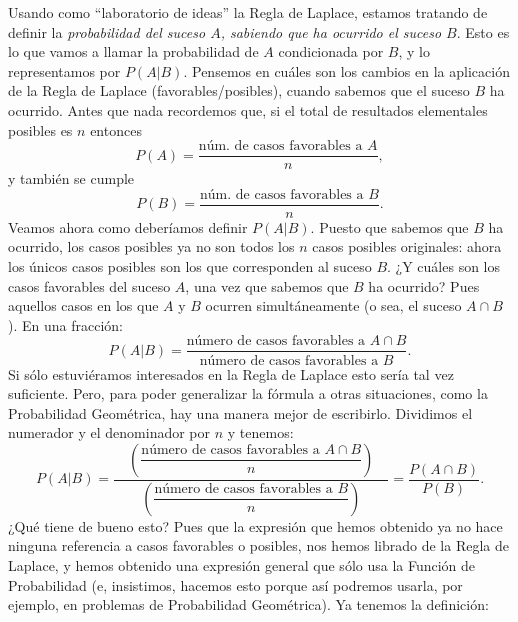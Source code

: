 Usando como ``laboratorio de ideas'' la Regla de Laplace, estamos tratando de
definir la {\em probabilidad del suceso $A$, {\sf sabiendo} que ha ocurrido
el suceso $B$}. Esto es lo que vamos a llamar la  {\sf probabilidad de $A$ condicionada por $B$, y lo
representamos por $P(A|B)$}. Pensemos en cuáles son los cambios en la
aplicación de la Regla de Laplace (favorables/posibles), cuando sabemos que
el suceso $B$ ha ocurrido. Antes que nada recordemos que, si el total de
resultados elementales posibles es $n$ entonces
    \[P(A)=\dfrac{\mbox{núm. de casos favorables a $A$}}{n},\]
y también se cumple
    \[P(B)=\dfrac{\mbox{núm. de casos favorables a $B$}}{n}.\]
Veamos ahora como deberíamos definir $P(A|B)$. Puesto que sabemos que $B$ ha
ocurrido, los casos posibles ya no son todos los $n$ casos posibles
originales: ahora los únicos casos posibles son los que corresponden al
suceso $B$.  ¿Y cuáles son los casos favorables del suceso $A$, una vez que
sabemos que $B$ ha ocurrido? Pues aquellos casos en los que $A$ y $B$ ocurren
simultáneamente (o sea, el suceso $A\cap B$). En una fracción:
    \[P(A|B)=\dfrac{\mbox{número de casos favorables a $A\cap B$}}{\mbox{número de casos favorables a $B$}}.\]
Si sólo estuviéramos interesados en la Regla de Laplace esto sería tal vez
suficiente. Pero, para poder generalizar la fórmula a otras situaciones, como
la Probabilidad Geométrica, hay una manera mejor de escribirlo. Dividimos el
numerador y el denominador por $n$ y tenemos:
    \[P(A|B)=\dfrac{\quad\left(\dfrac{\mbox{número de casos favorables a $A\cap B$}}{n}\right)\quad}{\left(\dfrac{\mbox{número de casos favorables a $B$}}{n}\right)}=\dfrac{P(A\cap B)}{P(B)}.\]
¿Qué tiene de bueno esto? Pues que la expresión que hemos obtenido ya no hace
ninguna referencia a casos favorables o posibles, nos hemos librado de la
Regla de Laplace, y hemos obtenido una expresión general que sólo usa la
Función de Probabilidad (e, insistimos, hacemos esto porque así podremos
usarla, por ejemplo, en problemas de Probabilidad Geométrica). Ya tenemos la
definición:
    \begin{center}
    \end{center}
